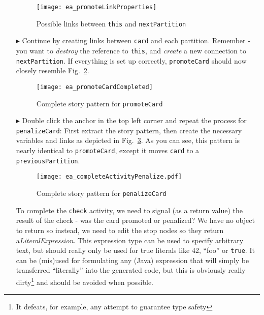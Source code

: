 \begin{itemize}
\begin{figure}[htbp]
\begin{center}
  \texttt{[image: ea\_promoteLinkProperties]}
  \caption{Possible links between \texttt{this} and \texttt{nextPartition}}
  \label{fig:sdm_check_link_variable}
\end{center}
\end{figure}

\vspace{0.5cm}

\item[$\blacktriangleright$] Continue by creating links between \texttt{card} and each partition. Remember - you want to \emph{destroy} the reference to
\texttt{this}, and \emph{create} a new connection to \texttt{nextPartition}. If everything is set up correctly, \texttt{promoteCard} should now closely resemble
Fig.~\ref{fig:sdm_check_complete_activity_node}.

\begin{figure}[htbp]
\begin{center}
  \texttt{[image: ea\_promoteCardCompleted]}
  \caption{Complete story pattern for \texttt{promoteCard}}
  \label{fig:sdm_check_complete_activity_node}
\end{center}
\end{figure}

\clearpage

\item[$\blacktriangleright$] Double click the anchor in the top left corner and repeat the process for \texttt{penalizeCard}: First extract the story pattern,
then create the necessary variables and links as depicted in Fig.~\ref{fig:sdm_check_complete_penalize}. As you can see, this pattern is nearly identical to
\texttt{promoteCard}, except it moves \texttt{card} to a \texttt{previousPartition}.

\vspace{0.5cm}

\begin{figure}[htbp]
\begin{center}
  \texttt{[image: ea\_completeActivityPenalize.pdf]}
  \caption{Complete story pattern for \texttt{penalizeCard}}
  \label{fig:sdm_check_complete_penalize}
\end{center}
\end{figure}


\vspace{0.5cm}

To complete the \texttt{check} activity, we need to signal (as a return value) the result of the check - was the card promoted or penalized? We have no object
to return so instead, we need to edit the stop nodes so they return a\emph{LiteralExpression}. This expression type can be used to
specify arbitrary text, but should really only be used for true literals like 42, ``foo'' or \texttt{true}. It can be (mis)used for formulating any (Java)
expression that will simply be transferred ``literally'' into the generated code, but this is obviously really dirty\footnote{It defeats, for example, any
attempt to guarantee type safety} and should be avoided when possible.


\end{itemize}
